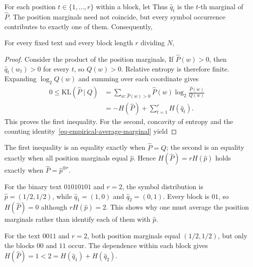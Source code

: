 For each position $t\in\{1,\ldots,r\}$ within a block, let
Thus $\hat q_t$ is the $t$-th marginal of $\hat P$. The position marginals need not coincide, but every symbol occurrence contributes to exactly one of them. Consequently,

\begin{prop}\label{prop-empirical-block-entropy}
For every fixed text and every block length $r$ dividing $N$,
\end{prop}

\begin{proof}
Consider the product of the position marginals,
If $\hat P(w)>0$, then $\hat q_t(w_t)>0$ for every $t$, so $Q(w)>0$. Relative entropy is therefore finite. Expanding $\log_2 Q(w)$ and summing over each coordinate gives
\begin{align*}
 0\leq\mathrm{KL}(\hat P\mid Q)
 &=\sum_{w:\hat P(w)>0}\hat P(w)\log_2\frac{\hat P(w)}{Q(w)}\\
 &=-H(\hat P)+\sum_{t=1}^rH(\hat q_t).
\end{align*}
This proves the first inequality. For the second, concavity of entropy and the counting identity~\eqref{eq-empirical-average-marginal} yield
\end{proof}

The first inequality is an equality exactly when $\hat P=Q$; the second is an equality exactly when all position marginals equal $\hat p$. Hence $H(\hat P)=rH(\hat p)$ holds exactly when $\hat P=\hat p^{\otimes r}$.

\begin{exmp}
For the binary text $01010101$ and $r=2$, the symbol distribution is $\hat p=(1/2,1/2)$, while $\hat q_1=(1,0)$ and $\hat q_2=(0,1)$. Every block is $01$, so $H(\hat P)=0$ although $rH(\hat p)=2$. This shows why one must average the position marginals rather than identify each of them with $\hat p$.

For the text $0011$ and $r=2$, both position marginals equal $(1/2,1/2)$, but only the blocks $00$ and $11$ occur. The dependence within each block gives $H(\hat P)=1<2=H(\hat q_1)+H(\hat q_2)$.
\end{exmp}

